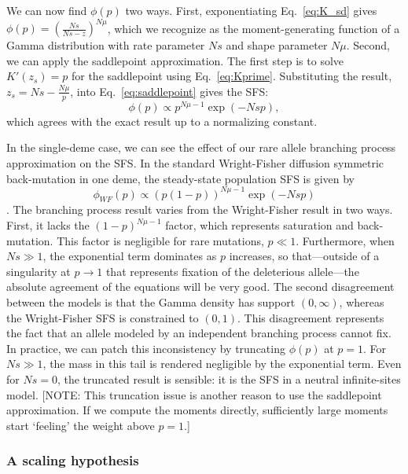 \documentclass{article}
\begin{document}
We can now find $\phi(p)$ two ways.
First, exponentiating Eq.~\ref{eq:K_sd} gives $\phi(p) = {\left( \frac{Ns}{Ns-z} \right)}^{N\mu}$, which we recognize as the moment-generating function of a Gamma distribution with rate parameter $Ns$ and shape parameter $N\mu$.
Second, we can apply the saddlepoint approximation.
The first step is to solve $K'(z_s) = p$ for the saddlepoint using Eq.~\ref{eq:Kprime}.
Substituting the result, $z_s = Ns - \frac{N\mu}{p}$, into  Eq.~\ref{eq:saddlepoint} gives the SFS:
\begin{equation}
    \phi(p) \propto p^{N\mu - 1} \exp(-Nsp),
\end{equation}
which agrees with the exact result up to a normalizing constant.

In the single-deme case, we can see the effect of our rare allele branching process approximation on the SFS.
In the standard Wright-Fisher diffusion symmetric back-mutation in one deme, the steady-state population SFS is given by
\begin{equation}
    \phi_{WF}(p) \propto {\left(p(1-p)\right)}^{N\mu-1} \exp(-Nsp)
\end{equation}
\cite{Kimura}.
The branching process result varies from the Wright-Fisher result in two ways.
First, it lacks the ${(1-p)}^{N\mu-1}$ factor, which represents saturation and back-mutation.
This factor is negligible for rare mutations, $p\ll1$.
Furthermore, when $Ns\gg1$, the exponential term dominates as $p$ increases, so that---outside of a singularity at $p\to1$ that represents fixation of the deleterious allele---the absolute agreement of the equations will be very good.
The second disagreement between the models is that the Gamma density has support $(0,\infty)$, whereas the Wright-Fisher SFS is constrained to $(0, 1)$.
This disagreement represents the fact that an allele modeled by an independent branching process cannot fix.
In practice, we can patch this inconsistency by truncating $\phi(p)$ at $p=1$.
For $Ns \gg 1$, the mass in this tail is rendered negligible by the exponential term.
Even for $Ns = 0$, the truncated result is sensible: it is the SFS in a neutral infinite-sites model.
[NOTE: This truncation issue is another reason to use the saddlepoint approximation. If we compute the moments directly, sufficiently large moments start `feeling' the weight above $p=1$.]

\subsubsection*{A scaling hypothesis}
\end{document}
